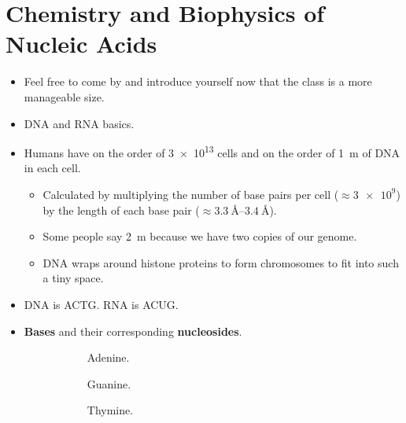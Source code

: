 \documentclass[../notes.tex]{subfiles}
\begin{document}
\section{Chemistry and Biophysics of Nucleic Acids}
\begin{itemize}
    \item {}Feel free to come by and introduce yourself now that the class is a more manageable size.
    \item DNA and RNA basics.
    \item Humans have on the order of \num{3e13} cells and on the order of \SI{1}{\meter} of DNA in each cell.
    \begin{itemize}
        \item Calculated by multiplying the number of base pairs per cell ($\approx\num{3e9}$) by the length of each base pair ($\approx\SIrange{3.3}{3.4}{\angstrom}$).
        \item Some people say \SI{2}{\meter} because we have two copies of our genome.
        \item DNA wraps around histone proteins to form chromosomes to fit into such a tiny space.
    \end{itemize}
    \item DNA is ACTG. RNA is ACUG.
    \item \textbf{Bases} and their corresponding \textbf{nucleosides}.
    \begin{figure}[h!]
        \centering
        \footnotesize
        \begin{subfigure}[b]{0.19\linewidth}
            \centering
            \caption{Adenine.}
            \label{fig:baseNucleosidea}
        \end{subfigure}
        \begin{subfigure}[b]{0.19\linewidth}
            \centering
            \caption{Guanine.}
            \label{fig:baseNucleosideb}
        \end{subfigure}
        \begin{subfigure}[b]{0.19\linewidth}
            \centering
            \vspace{1em}
            \caption{Thymine.}
            \label{fig:baseNucleosidec}
        \end{subfigure}
        \begin{subfigure}[b]{0.19\linewidth}

\end{subfigure}
\end{figure}
\end{itemize}
\end{document}
